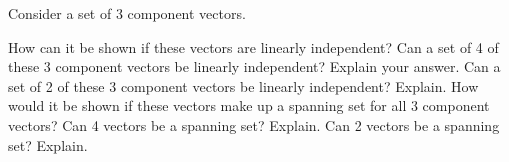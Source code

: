 \documentclass{ximera}
\begin{document}
\begin{exercise}%
    Consider a set of 3 component vectors.
    \begin{tasks}
        \task How can it be shown if these vectors are linearly independent?
        \task Can a set of 4 of these 3 component vectors be linearly independent? Explain your answer.
        \task Can a set of 2 of these 3 component vectors be linearly independent? Explain.
        \task How would it be shown if these vectors make up a spanning set for all 3 component vectors?
        \task Can 4 vectors be a spanning set? Explain.
        \task Can 2 vectors be a spanning set? Explain.
    \end{tasks}
\end{exercise}
\end{document}

